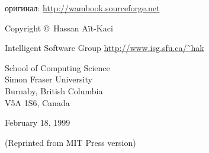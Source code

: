 \maketitle
оригинал: \url{http://wambook.sourceforge.net}

\bigskip
Copyright \copyright\ Hassan A\"it-Kaci 

\bigskip\noindent
Intelligent Software Group
\url{http://www.isg.sfu.ca/˜hak}

\bigskip\noindent
School of Computing Science\\
Simon Fraser University\\
Burnaby, British Columbia\\
V5A 1S6, Canada

\bigskip
February 18, 1999

(Reprinted from MIT Press version)

\tableofcontents
\secdown
